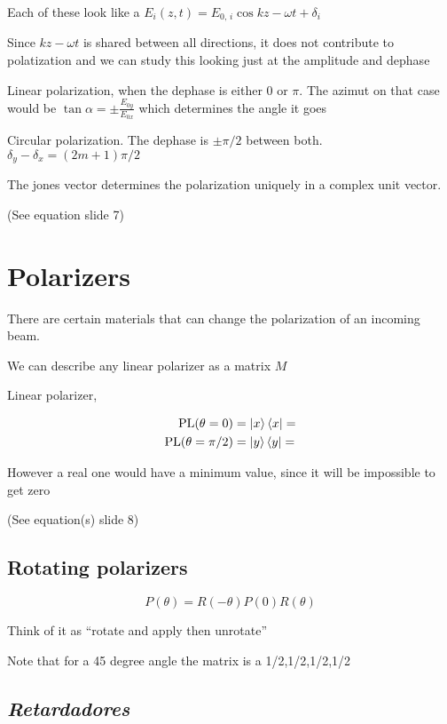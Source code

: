 \documentclass[../main/main.tex]{subfiles}
\begin{document}
Each of these look like a $E_i(z,t) = E_{0,\,i}\cos{k z - \omega t + \delta_i}$

Since $k z - \omega t$ is shared between all directions, it does not contribute to polatization and we can study this looking just at the amplitude and dephase

Linear polarization, when the dephase is either 0 or $\pi$. The azimut on that case would be $\tan \alpha = \pm \frac{E_{0y}}{E_{0x}}$ which determines the angle it goes

Circular polarization. The dephase is $\pm \pi/2$ between both. $\delta_y - \delta_x = (2m + 1)\pi/2$


The jones vector determines the polarization uniquely in a complex unit vector.

(See equation slide 7)

\section{Polarizers}

There are certain materials that can change the polarization of an incoming beam.

We can describe any linear polarizer as a matrix $M$

Linear polarizer,


\begin{align*}
	\textrm{PL}(\theta = 0)       & = \ket{x}\bra{x} = \\
	\textrm{PL}(\theta = \pi / 2) & = \ket{y}\bra{y} =
\end{align*}

However a real one would have a minimum value, since it will be impossible to get zero

(See equation(s) slide 8)


\subsection{Rotating polarizers}

\begin{equation}
	P(\theta) = R(-\theta) P(0) R(\theta)
\end{equation}

Think of it as ``rotate and apply then unrotate''

Note that for a 45 degree angle the matrix is a 1/2,1/2,1/2,1/2

\subsection{\emph{Retardadores}}
\end{document}
